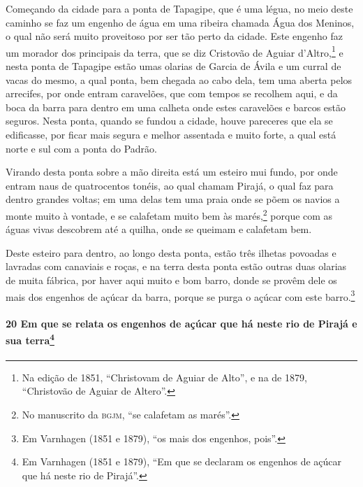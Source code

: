 Começando da cidade para a ponta de Tapagipe, que é uma légua, no meio deste caminho se
faz um engenho de água em uma ribeira chamada Água dos Meninos, o qual não será muito
proveitoso por ser tão perto da cidade. Este engenho faz um morador dos principais da
terra, que se diz Cristovão de Aguiar d'Altro,\footnote{ Na edição de 1851, ``Christovam
de Aguiar de Alto'', e na de 1879, ``Christovão de Aguiar de Altero''.} e nesta ponta de
Tapagipe estão umas olarias de Garcia de Ávila e um curral de vacas do mesmo, a qual
ponta, bem chegada ao cabo dela, tem uma aberta pelos arrecifes, por onde entram
caravelões, que com tempos se recolhem aqui, e da boca da barra para dentro em uma calheta
onde estes caravelões e barcos estão seguros. Nesta ponta, quando se fundou a cidade,
houve pareceres que ela se edificasse, por ficar mais segura e melhor assentada e muito
forte, a qual está norte e sul com a ponta do Padrão.

Virando desta ponta sobre a mão direita está um esteiro mui fundo, por onde entram naus de
quatrocentos tonéis, ao qual chamam Pirajá, o qual faz para dentro grandes voltas; em uma
delas tem uma praia onde se põem os navios a monte muito à vontade, e se calafetam muito
bem às marés,\footnote{ No manuscrito da \textsc{bgjm}, ``se calafetam as marés''.} porque
com as águas vivas descobrem até a quilha, onde se queimam e calafetam bem.

Deste esteiro para dentro, ao longo desta ponta, estão três ilhetas povoadas e lavradas
com canaviais e roças, e na terra desta ponta estão outras duas olarias de muita fábrica,
por haver aqui muito e bom barro, donde se provêm dele os mais dos engenhos de açúcar da
barra, porque se purga o açúcar com este barro.\footnote{ Em Varnhagen (1851 e 1879), ``os
mais dos engenhos, pois''.}

\paragraph{20 Em que se relata os engenhos de açúcar que há neste rio de Pirajá e sua
terra\protect\footnote{ Em Varnhagen (1851 e 1879), ``Em que se declaram os engenhos de
açúcar que há neste rio de Pirajá''.}}

